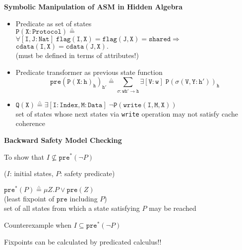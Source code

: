 \documentclass[landscape]{slides}
\def\DEF{\mathrel{\stackrel{_\triangle}{=}}}
\begin{document}
\begin{slide}\large\parskip=0pt
  \textbf{Symbolic Manipulation of ASM in Hidden Algebra}
  \begin{itemize}\itemsep=0pt
  \item Predicate as set of states\\
    $\mathtt{P(X:Protocol)\DEF}$\\
    $\mathtt{\forall[I,J:Nat]\;flag(I,X)=flag(J,X)=shared\Rightarrow}$\\
    \hspace*{48mm}$\mathtt{cdata(I,X)=cdata(J,X).}$\\
    (must be defined in terms of attributes!)
  \item Predicate transformer as previous state function
    \begin{displaymath}
      \mathtt{pre(P(X:h)_h)_{h'}\DEF
        \sum_{\sigma:wh'\rightarrow h}\exists[V:w]\;P(\sigma(V,Y:h'))_h}
    \end{displaymath}
  \item $\mathtt{Q(X)\DEF\exists[I:Index,M:Data]\;\neg P(write(I,M,X))}$\\
    set of states whose next states via \texttt{write} operation may
    not satisfy cache coherence
  \end{itemize}
\end{slide}


\begin{slide}\large\parskip=0pt
  \textbf{Backward Safety Model Checking}

  \bigskip\bigskip

  To show that $I\not\subseteq\mathtt{pre}^*(\neg P)$

  ($I$: initial states, $P$: safety predicate)

  \bigskip\bigskip
  
  $\mathtt{pre}^*(P)\DEF\mu Z.P\vee\mathtt{pre}(Z)$\\
  (least fixpoint of $\mathtt{pre}$ including $P$)\\
  set of all states from which a state satisfying $P$ may be reached

  \bigskip\bigskip

  Counterexample when $I\subseteq\mathtt{pre}^*(\neg P)$

  \bigskip\bigskip

  Fixpoints can be calculated by predicated calculus!!

\end{slide}  
\end{document}

